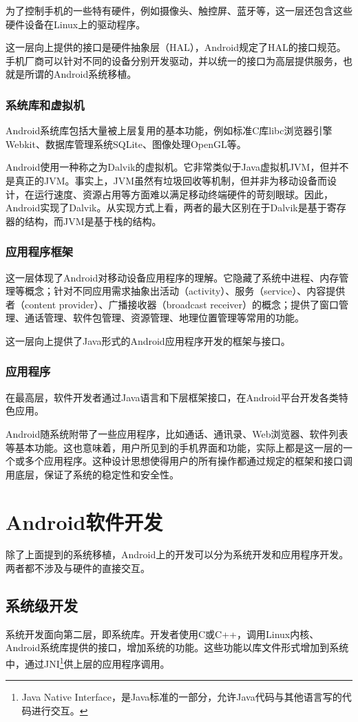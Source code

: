 为了控制手机的一些特有硬件，例如摄像头、触控屏、蓝牙等，这一层还包含这些硬件设备在Linux上的驱动程序。

这一层向上提供的接口是硬件抽象层（HAL），Android规定了HAL的接口规范。手机厂商可以针对不同的设备分别开发驱动，并以统一的接口为高层提供服务，也就是所谓的Android系统移植。

\subsubsection{系统库和虚拟机}
Android系统库包括大量被上层复用的基本功能，例如标准C库libc浏览器引擎Webkit、数据库管理系统SQLite、图像处理OpenGL等。

Android使用一种称之为Dalvik的虚拟机。它非常类似于Java虚拟机JVM，但并不是真正的JVM。事实上，JVM虽然有垃圾回收等机制，但并非为移动设备而设计，在运行速度、资源占用等方面难以满足移动终端硬件的苛刻眼球。因此，Android实现了Dalvik。从实现方式上看，两者的最大区别在于Dalvik是基于寄存器的结构，而JVM是基于栈的结构。

\subsubsection{应用程序框架}
这一层体现了Android对移动设备应用程序的理解。它隐藏了系统中进程、内存管理等概念；针对不同应用需求抽象出活动（activity）、服务（service）、内容提供者（content provider）、广播接收器（broadcast receiver）的概念；提供了窗口管理、通话管理、软件包管理、资源管理、地理位置管理等常用的功能。

这一层向上提供了Java形式的Android应用程序开发的框架与接口。

\subsubsection{应用程序}
在最高层，软件开发者通过Java语言和下层框架接口，在Android平台开发各类特色应用。

Android随系统附带了一些应用程序，比如通话、通讯录、Web浏览器、软件列表等基本功能。这也意味着，用户所见到的手机界面和功能，实际上都是这一层的一个或多个应用程序。这种设计思想使得用户的所有操作都通过规定的框架和接口调用底层，保证了系统的稳定性和安全性。

\section{Android软件开发}
除了上面提到的系统移植，Android上的开发可以分为系统开发和应用程序开发。两者都不涉及与硬件的直接交互。

\subsection{系统级开发}
系统开发面向第二层，即系统库。开发者使用C或C++，调用Linux内核、Android系统库提供的接口，增加系统的功能。这些功能以库文件形式增加到系统中，通过JNI\footnote{Java Native Interface，是Java标准的一部分，允许Java代码与其他语言写的代码进行交互。}供上层的应用程序调用。

